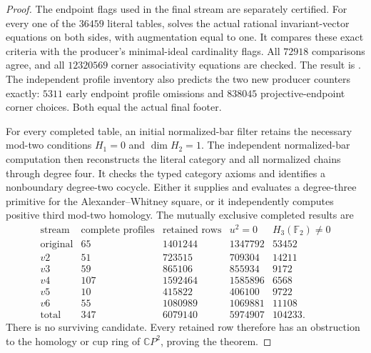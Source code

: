 \begin{proof}
The endpoint flags used in the final stream are separately
certified.  For every one of the $36459$ literal tables,
solves the actual rational invariant-vector equations
on both sides, with augmentation equal to one.  It
compares these exact criteria with the producer's
minimal-ideal cardinality flags.  All $72918$ comparisons
agree, and all $12320569$ corner associativity equations
are checked.  The result is
.
The independent profile inventory also predicts the two
new producer counters exactly: $5311$ early endpoint
profile omissions and $838045$ projective-endpoint corner
choices.  Both equal the actual final footer.

For every completed table, an initial normalized-bar filter
retains the necessary mod-two conditions $H_1=0$ and
$\dim H_2=1$.  The independent normalized-bar computation
 then reconstructs
the literal category and all normalized chains through
degree four.  It checks the typed category axioms and
identifies a nonboundary degree-two cocycle.  Either it
supplies and evaluates a degree-three primitive for the
Alexander--Whitney square, or it independently computes
positive third mod-two homology.  The mutually exclusive
completed results are
\[
\begin{array}{c|r|r|r|r}
 \text{stream}&\text{complete profiles}&\text{retained rows}
   &u^2=0&H_3(\mathbb F_2)\ne0\\\hline
 \text{original}&65&1401244&1347792&53452\\
 v2&51&723515&709304&14211\\
 v3&59&865106&855934&9172\\
 v4&107&1592464&1585896&6568\\
 v5&10&415822&406100&9722\\
 v6&55&1080989&1069881&11108\\\hline
 \text{total}&347&6079140&5974907&104233.
\end{array}
\]
There is no surviving candidate.  Every retained row
therefore has an obstruction to the homology or cup ring
of $\mathbb CP^2$, proving the theorem.
\end{proof}

